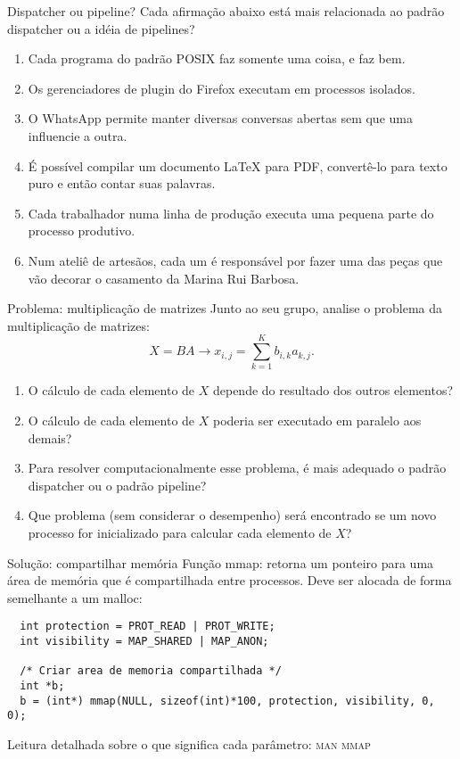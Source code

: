 \documentclass{beamer}
\begin{document}
\begin{frame}[fragile]{Dispatcher ou pipeline?}
  \centering
  \Large
  Cada afirmação abaixo está mais relacionada ao padrão dispatcher ou a idéia de
  pipelines?
  \begin{enumerate}
  \item Cada programa do padrão POSIX faz somente uma coisa, e faz bem.
  \item Os gerenciadores de plugin do Firefox executam em processos isolados.
  \item O WhatsApp permite manter diversas conversas abertas sem que uma
    influencie a outra.
  \item É possível compilar um documento LaTeX para PDF, convertê-lo para
    texto puro e então contar suas palavras.
  \item Cada trabalhador numa linha de produção executa uma pequena parte do
    processo produtivo.
  \item Num ateliê de artesãos, cada um é responsável por fazer uma das peças
    que vão decorar o casamento da Marina Rui Barbosa.
  \end{enumerate}
\end{frame}

\begin{frame}[fragile]{Problema: multiplicação de matrizes}
  \centering
  \Large
  Junto ao seu grupo, analise o problema da multiplicação de matrizes:
  \begin{equation}
  X = BA \rightarrow x_{i,j} = \sum_{k=1}^K b_{i, k} a_{k, j}.
  \end{equation}
  \begin{enumerate}
    \item O cálculo de cada elemento de $X$ depende do resultado dos outros
      elementos?
    \item O cálculo de cada elemento de $X$ poderia ser executado em paralelo
      aos demais?
    \item Para resolver computacionalmente esse problema, é mais adequado o
      padrão dispatcher ou o padrão pipeline?
    \item Que problema (sem considerar o desempenho) será encontrado se um novo
      processo for inicializado para calcular cada elemento de $X$?
  \end{enumerate}
\end{frame}

\begin{frame}[fragile]{Solução: compartilhar memória}
  \Large
  Função mmap: retorna um ponteiro para uma área de memória que é compartilhada
  entre processos. Deve ser alocada de forma semelhante a um malloc:
  \begin{verbatim}
  int protection = PROT_READ | PROT_WRITE;
  int visibility = MAP_SHARED | MAP_ANON;

  /* Criar area de memoria compartilhada */
  int *b;
  b = (int*) mmap(NULL, sizeof(int)*100, protection, visibility, 0, 0);
  \end{verbatim}

  Leitura detalhada sobre o que significa cada parâmetro: \textsc{man mmap}
\end{frame}
\end{document}
